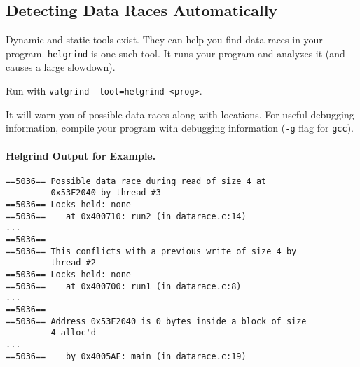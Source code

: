 \documentclass[11pt]{article}
\begin{document}
\subsection*{Detecting Data Races Automatically}  
Dynamic and static tools exist. They can help you find data races in
your program. {\tt helgrind} is one such tool. It runs your program 
and analyzes it (and causes a large slowdown).

Run with {\tt valgrind --tool=helgrind <prog>}.

It will warn you of possible data races along with locations. For
useful debugging information, compile your program with debugging
information ({\tt -g} flag for {\tt gcc}).

\paragraph{Helgrind Output for Example.}
\begin{lstlisting}
==5036== Possible data race during read of size 4 at
         0x53F2040 by thread #3
==5036== Locks held: none
==5036==    at 0x400710: run2 (in datarace.c:14)
...
==5036== 
==5036== This conflicts with a previous write of size 4 by
         thread #2
==5036== Locks held: none
==5036==    at 0x400700: run1 (in datarace.c:8)
...
==5036== 
==5036== Address 0x53F2040 is 0 bytes inside a block of size
         4 alloc'd
...
==5036==    by 0x4005AE: main (in datarace.c:19)
\end{lstlisting}
\end{document}
